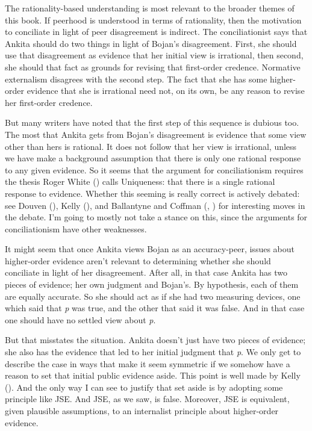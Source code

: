 \documentclass[
  10pt,
  letterpaper,
  twoside]{scrbook}
\begin{document}
The rationality-based understanding is most relevant to the broader
themes of this book. If peerhood is understood in terms of rationality,
then the motivation to conciliate in light of peer disagreement is
indirect. The conciliationist says that {Ankita} should do two things in
light of {Bojan}'s disagreement. First, she should use that disagreement
as evidence that her initial view is irrational, then second, she should
that fact as grounds for revising that first-order credence. Normative
externalism disagrees with the second step. The fact that she has some
higher-order evidence that she is irrational need not, on its own, be
any reason to revise her first-order credence.

But many writers have noted that the first step of this sequence is
dubious too. The most that {Ankita} gets from {Bojan}'s disagreement is
evidence that some view other than hers is rational. It does not follow
that her view is irrational, unless we have make a background assumption
that there is only one rational response to any given evidence. So it
seems that the argument for conciliationism requires the thesis Roger
White () calls Uniqueness: that there is a
single rational response to evidence. Whether this seeming is really
correct is actively debated: see Douven
(), Kelly
(), and Ballantyne and Coffman
(,
) for interesting moves in the
debate. I'm going to mostly not take a stance on this, since the
arguments for conciliationism have other weaknesses.

It might seem that once {Ankita} views {Bojan} as an accuracy-peer,
issues about higher-order evidence aren't relevant to determining
whether she should conciliate in light of her disagreement. After all,
in that case {Ankita} has two pieces of evidence; her own judgment and
{Bojan}'s. By hypothesis, each of them are equally accurate. So she
should act as if she had two measuring devices, one which said that
\emph{p} was true, and the other that said it was false. And in that
case one should have no settled view about \emph{p}.

But that misstates the situation. {Ankita} doesn't just have two pieces
of evidence; she also has the evidence that led to her initial judgment
that \emph{p}. We only get to describe the case in ways that make it
seem symmetric if we somehow have a reason to set that initial public
evidence aside. This point is well made by Kelly
(). And the only way I can see to justify
that set aside is by adopting some principle like JSE. And JSE, as we
saw, is false. Moreover, JSE is equivalent, given plausible assumptions,
to an internalist principle about higher-order evidence.
\end{document}
